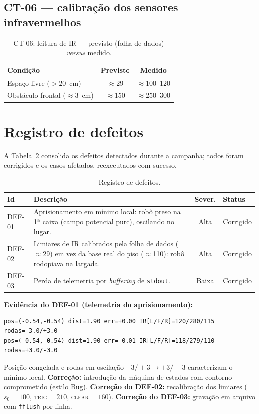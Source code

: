 \subsection{CT-06 --- calibração dos sensores infravermelhos}
\begin{table}[H]\centering
\caption{CT-06: leitura de IR --- previsto (folha de dados) \emph{versus} medido.}
\label{tab:calib}
\begin{tabularx}{\textwidth}{@{}X c c@{}}
\toprule
\textbf{Condição} & \textbf{Previsto} & \textbf{Medido} \\
\midrule
Espaço livre ($>20$~cm) & $\approx 29$ & $\approx 100$--$120$ \\
Obstáculo frontal ($\approx 3$~cm) & $\approx 150$ & $\approx 250$--$300$ \\
\bottomrule
\end{tabularx}
\end{table}

\section{Registro de defeitos}
A Tabela~\ref{tab:def} consolida os defeitos detectados durante a campanha; todos foram corrigidos e os casos afetados, reexecutados com sucesso.

\begin{table}[H]\centering
\caption{Registro de defeitos.}
\label{tab:def}
\renewcommand{\arraystretch}{1.25}
\begin{tabularx}{\textwidth}{@{}l X c l@{}}
\toprule
\textbf{Id} & \textbf{Descrição} & \textbf{Sever.} & \textbf{Status} \\
\midrule
DEF-01 & Aprisionamento em mínimo local: robô preso na 1ª caixa (campo potencial puro), oscilando no lugar. & Alta & Corrigido \\
DEF-02 & Limiares de IR calibrados pela folha de dados ($\approx$29) em vez da base real do piso ($\approx$110): robô rodopiava na largada. & Alta & Corrigido \\
DEF-03 & Perda de telemetria por \emph{buffering} de \texttt{stdout}. & Baixa & Corrigido \\
\bottomrule
\end{tabularx}
\end{table}

\noindent\textbf{Evidência do DEF-01 (telemetria do aprisionamento):}
\begin{lstlisting}[style=c]
pos=(-0.54,-0.54) dist=1.90 err=+0.00 IR[L/F/R]=120/280/115 rodas=-3.0/+3.0
pos=(-0.54,-0.54) dist=1.90 err=-0.01 IR[L/F/R]=118/279/110 rodas=+3.0/-3.0
\end{lstlisting}
\noindent Posição congelada e rodas em oscilação $-3/+3 \to +3/-3$ caracterizam o mínimo local. \textbf{Correção:} introdução da máquina de estados com contorno comprometido (estilo Bug). \textbf{Correção do DEF-02:} recalibração dos limiares ($s_0{=}100$, \textsc{trig}${=}210$, \textsc{clear}${=}160$). \textbf{Correção do DEF-03:} gravação em arquivo com \texttt{fflush} por linha.

